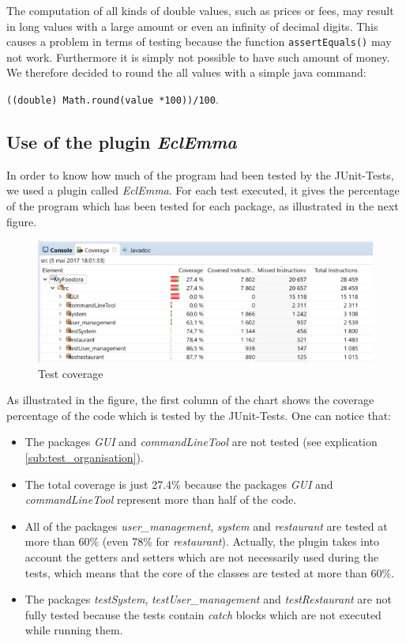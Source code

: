 The computation of all kinds of double values, such as prices or fees, may result in long 
values with a large amount or even an infinity of decimal digits. This causes a problem in 
terms of testing because the function \lstinline|assertEquals()| may not work. Furthermore 
it is simply not possible to have such amount of money. We therefore decided to round the 
all values with a simple java command:

\lstinline|((double) Math.round(value *100))/100|.

\subsection{Use of the plugin \textit{EclEmma}}
\label{sub:use_of_the_plugin_EclEmma}

In order to know how much of the program had been tested by the JUnit-Tests, we used a plugin called \textit{EclEmma}. For each test executed, it gives the percentage of the program which has been tested for each package, as illustrated in the next figure. 
\begin{figure}[H]
	\centering
	\includegraphics[width=1\linewidth]{./ima/testcoverage.jpg}
	\caption{Test coverage}
	\label{fig:test-coverage}
\end{figure}
As illustrated in the figure, the first column of the chart shows the coverage percentage of the code which is tested by the JUnit-Tests. One can notice that:
\begin{itemize}
	\item{} The packages \textit{GUI} and \textit{commandLineTool} are not tested (see explication \ref{sub:test_organisation}).
	\item{} The total coverage is just 27.4\% because the packages \textit{GUI} and \textit{commandLineTool}  represent more than half of the code.
	\item{} All of the packages \textit{user\_management}, \textit{system} and \textit{restaurant} are tested at more than 60\% (even 78\% for \textit{restaurant}). Actually, the plugin takes into account the getters and setters which are not necessarily used during the tests, which means that the core of the classes are tested at more than 60\%.
	\item{} The packages \textit{testSystem}, \textit{testUser\_management} and \textit{testRestaurant} are not fully tested because the tests contain \textit{catch} blocks which are not executed while running them.
\end{itemize}

